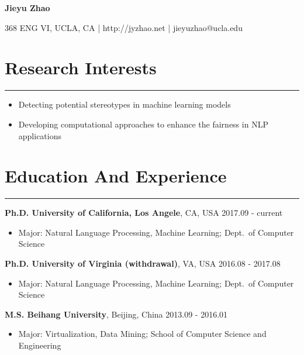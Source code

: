 \documentclass[11pt, a4paper]{article}
\newcommand{\hr}{\hrule\vspace{0.5em}}
\begin{document}
	

\begin{center}
	{\large \bf Jieyu Zhao}
\end{center}
\begin{center}
	{368 ENG VI, UCLA, CA | {http://jyzhao.net} | {jieyuzhao@ucla.edu}}
\end{center}

\section*{Research Interests}
\hr
\begin{itemize}
\item Detecting potential stereotypes in machine learning models
\item Developing computational approaches to enhance the fairness in NLP applications
\end{itemize}


\section*{Education And Experience}
\hr
\textbf{Ph.D. University of California, Los Angele}, CA, USA \hfill {2017.09 - current}
	\begin{itemize}
	\item Major: Natural Language Processing, Machine Learning; Dept.~of Computer Science
	\end{itemize}

\textbf{Ph.D. University of Virginia (withdrawal)}, VA, USA \hfill 2016.08 - 2017.08
	\begin{itemize}
	\item Major: Natural Language Processing, Machine Learning; Dept.~of Computer Science
	\end{itemize}

\textbf{M.S. Beihang University}, Beijing, China \hfill 2013.09 - 2016.01
	\begin{itemize}
	\item Major: Virtualization, Data Mining; School of Computer Science and Engineering
	\end{itemize}
\end{document}
